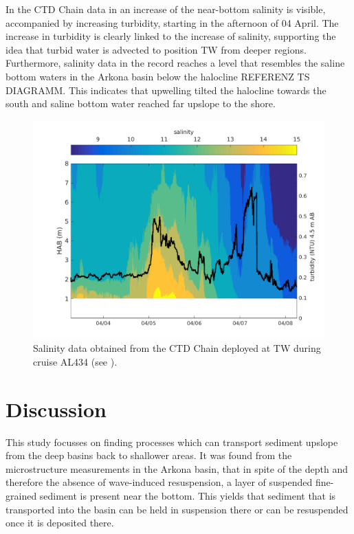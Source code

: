  In the CTD Chain data in  an increase of the 
near-bottom salinity is visible, accompanied by increasing turbidity, starting 
in the 
afternoon of 04 April. The increase in turbidity is clearly linked to the 
increase of salinity, supporting the idea that turbid water is advected to 
position TW from deeper 
regions. Furthermore, salinity data in the record reaches a level that 
resembles the saline bottom waters in the Arkona basin below the 
halocline REFERENZ TS DIAGRAMM. This indicates that upwelling 
tilted the halocline towards the south and saline bottom water reached far 
upslope to the shore.

 \begin{figure}[ht]
\includegraphics[width=15cm]{bilder/ctdchaintw.png}
 \caption{Salinity data obtained from the CTD Chain deployed at TW 
during cruise AL434 (see ).}
 \label{ctdchain}
 \end{figure}

\FloatBarrier
\section{Discussion}

This study focusses on finding processes which can transport sediment upslope 
from the deep basins back to shallower areas. It was found from the 
microstructure measurements in the Arkona basin, that in spite of the depth and 
therefore the absence of wave-induced resuspension, a layer of 
suspended fine-grained sediment is present near the bottom. This yields that 
sediment that is transported into the basin can be held in suspension there 
or can be resuspended once it is deposited there.

